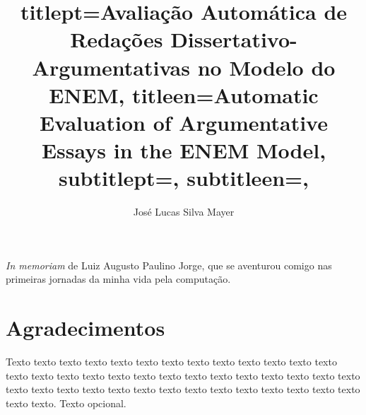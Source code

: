 \documentclass[12pt,twoside,english,brazilian]{book}
\title{
    titlept={Avaliação Automática de Redações Dissertativo-Argumentativas no Modelo do ENEM},
    titleen={Automatic Evaluation of Argumentative Essays in the ENEM Model},
    subtitlept={},
    subtitleen={},
}
\author{José Lucas Silva Mayer}
\begin{document}

\frontmatter

\pagestyle{plain}

\onehalfspacing %

\maketitle %


\begin{dedicatoria}
\textit{In memoriam} de Luiz Augusto Paulino Jorge, que se aventurou comigo nas
primeiras jornadas da minha vida pela computação.
\end{dedicatoria}


\chapter*{Agradecimentos}

Texto texto texto texto texto texto texto texto texto texto texto texto texto
texto texto texto texto texto texto texto texto texto texto texto texto texto
texto texto texto texto texto texto texto texto texto texto texto texto texto
texto texto texto texto. Texto opcional.




\end{document}
